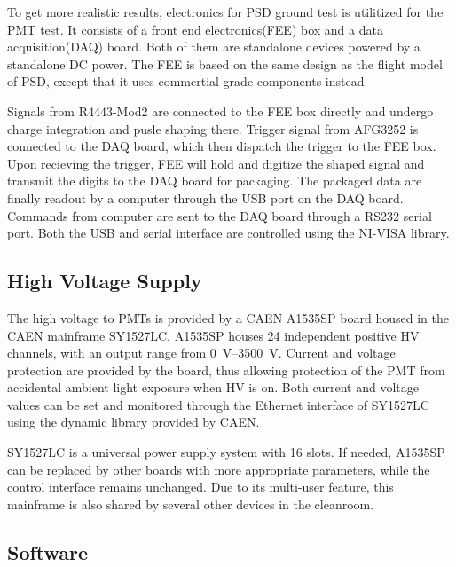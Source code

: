 \documentclass[5p, times]{elsarticle}
\begin{document}
To get more realistic results, electronics for PSD ground test is utilitized for the PMT test.
It consists of a front end electronics(FEE) box and a data acquisition(DAQ) board.
Both of them are standalone devices powered by a standalone DC power.
The FEE is based on the same design as the flight model of PSD, except that it uses commertial grade components instead.

Signals from R4443-Mod2 are connected to the FEE box directly and undergo charge integration and pusle shaping there.
Trigger signal from AFG3252 is connected to the DAQ board, which then dispatch the trigger to the FEE box.
Upon recieving the trigger, FEE will hold and digitize the shaped signal and transmit the digits to the DAQ board for packaging.
The packaged data are finally readout by a computer through the USB port on the DAQ board.
Commands from computer are sent to the DAQ board through a RS232 serial port.
Both the USB and serial interface are controlled using the NI-VISA library.

\subsection{High Voltage Supply}
\label{sec:hv}

The high voltage to PMTs is provided by a CAEN A1535SP board housed in the CAEN mainframe SY1527LC. 
A1535SP houses 24 independent positive HV channels, with an output range from \SIrange{0}{3500}{\volt}.
Current and voltage protection are provided by the board, thus allowing protection of the PMT from accidental ambient light exposure when HV is on.
Both current and voltage values can be set and monitored through the Ethernet interface of SY1527LC using the dynamic library provided by CAEN.

SY1527LC is a universal power supply system with 16 slots.
If needed, A1535SP can be replaced by other boards with more appropriate parameters, while the control interface remains unchanged.
Due to its multi-user feature, this mainframe is also shared by several other devices in the cleanroom.

\subsection{Software}
\label{sec:software}
\end{document}
